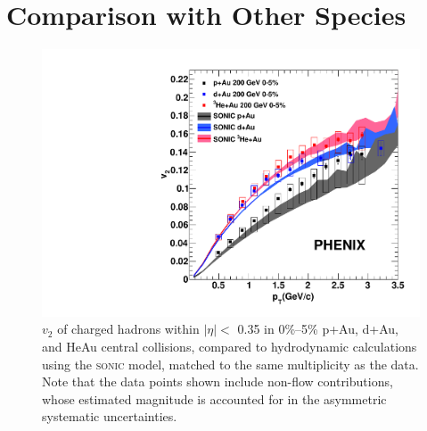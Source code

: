 \section{Comparison with Other Species}

\begin{figure}
\begin{center}
\includegraphics[width=0.5\linewidth]{figs/three_system_comparison_result.pdf}
\caption{$v_2$ of charged hadrons within $|\eta| <$ 0.35 in 0\%--5\% p+Au, d+Au, and HeAu central collisions, compared to hydrodynamic calculations using the \textsc{sonic} model, matched to the same multiplicity as the data. Note that the data points shown include non-flow contributions, whose estimated magnitude is accounted for in the asymmetric systematic uncertainties.}
\label{fig:all_system_hydro}
\end{center}
\end{figure}

